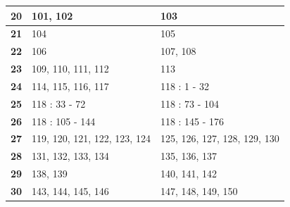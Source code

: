 {{\begin{table}[h]
\begin{tabular}{|l|l|l|}
  \textbf{20}   & 101, 102                     & 103                          \\ \hline
  \textbf{21}   & 104                          & 105                          \\ \hline
  \textbf{22}   & 106                          & 107, 108                     \\ \hline
  \textbf{23}   & 109, 110, 111, 112           & 113                          \\ \hline
  \textbf{24}   & 114, 115, 116, 117           & 118 : 1 - 32                 \\ \hline
  \textbf{25}   & 118 : 33 - 72                & 118 : 73 - 104               \\ \hline
  \textbf{26}   & 118 : 105 - 144              & 118 : 145 - 176              \\ \hline
  \textbf{27}   & 119, 120, 121, 122, 123, 124 & 125, 126, 127, 128, 129, 130 \\ \hline
  \textbf{28}   & 131, 132, 133, 134           & 135, 136, 137                \\ \hline
  \textbf{29}   & 138, 139                     & 140, 141, 142                \\ \hline
  \textbf{30}   & 143, 144, 145, 146           & 147, 148, 149, 150           \\ \hline
  \end{tabular}
  \end{table}
}

\vfill\vfill
}
\newpage
